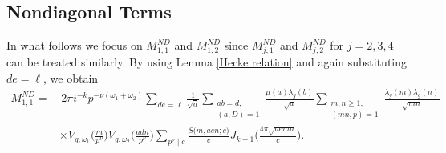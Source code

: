 \documentclass[12pt]{amsart}
\theoremstyle{plain}
\theoremstyle{definition}
\begin{document}
    
\subsection{Nondiagonal Terms} 

In what follows we focus on $M^{ND}_{1, 1} $ and $M^{ND}_{1, 2}$ since $M^{ND}_{j,1}$ and $M^{ND}_{j,2}$ for $j=2,3,4$ can be treated similarly. By using Lemma \ref{Hecke relation} and again substituting $de=\ell$, we obtain 
    \begin{align*}
    M^{ND}_{1, 1} 
    =&\,  2\pi i^{-k} 
    p^{-\nu(\omega_1+\omega_2)} 
     \sum_{de= \ell} 
     \frac{1}{\sqrt d}
     \sum_{\substack{ab=d, \\ (a, D)=1}}
     \frac{\mu(a) \lambda_g(b)}{\sqrt a}
     \sum_{\substack{m, n \geq 1,\\ (mn, p)=1}}
    \frac{\lambda_g(m) \lambda_g(n)}{\sqrt{mn}}
     \\
    &\times 
    V_{g, \omega_1}\Big(\frac{m}{p^\nu }\Big) 
    V_{g, \omega_2}\Big(\frac{adn}{p^\nu }\Big)
    \sum_{p^\nu \mid c} 
    \frac{S\big(m, aen; c\big)}{c}
    J_{k-1}\Big(\frac{4\pi\sqrt{aemn}}{c}\Big) .
    \end{align*}
    
\end{document}
